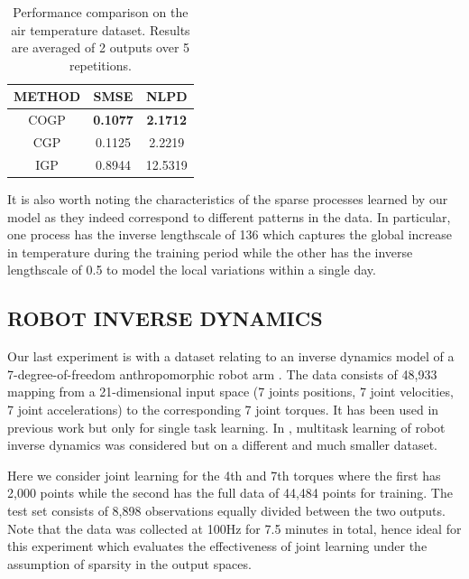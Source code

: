 \setlength{\tabcolsep}{4pt}
\begin{table}[t]
\caption{Performance comparison on the air temperature dataset. Results are averaged of 2 outputs over 5 repetitions. }
\label{tab:air}
\begin{center}
\begin{tabular}{ccc}
\toprule
\textbf{METHOD} & \textbf{SMSE} & \textbf{NLPD} \\
\hline
COGP & \textbf{0.1077} & \textbf{2.1712} \\
CGP & 0.1125 & 2.2219 \\
IGP & 0.8944 & 12.5319 \\
\bottomrule
\end{tabular}
\end{center}
\end{table}

It is also worth noting the characteristics of the sparse processes learned by our model as they indeed correspond to different patterns in the data.
In particular, one process has the inverse lengthscale of 136 which captures the global increase in temperature during the training period while the other has the inverse lengthscale of 0.5 to model the local variations within a single day.

\subsection{ROBOT INVERSE DYNAMICS}
Our last experiment is with a dataset relating to an inverse dynamics model of a 7-degree-of-freedom anthropomorphic robot arm \citep{vijayakumar2000locally}.
The data consists of 48,933 mapping from a 21-dimensional input space (7 joints positions, 7 joint velocities, 7 joint accelerations) to the corresponding 7 joint torques.
It has been used in previous work \citep[see e.g.][]{rasmussen-williams-book,vijayakumar2000locally} but only for single task learning. 
In \citep{chai2008multi}, multitask learning of robot inverse dynamics was considered but on a different and much smaller dataset.

Here we consider joint learning for the 4th and 7th torques where the first has 2,000 points  while the second has the full data of 44,484 points for training.
The test set consists of 8,898 observations equally divided between the two outputs.
Note that the data was collected at 100Hz for 7.5 minutes in total, hence ideal for this experiment which evaluates the effectiveness of joint learning under the assumption of sparsity in the output spaces.

